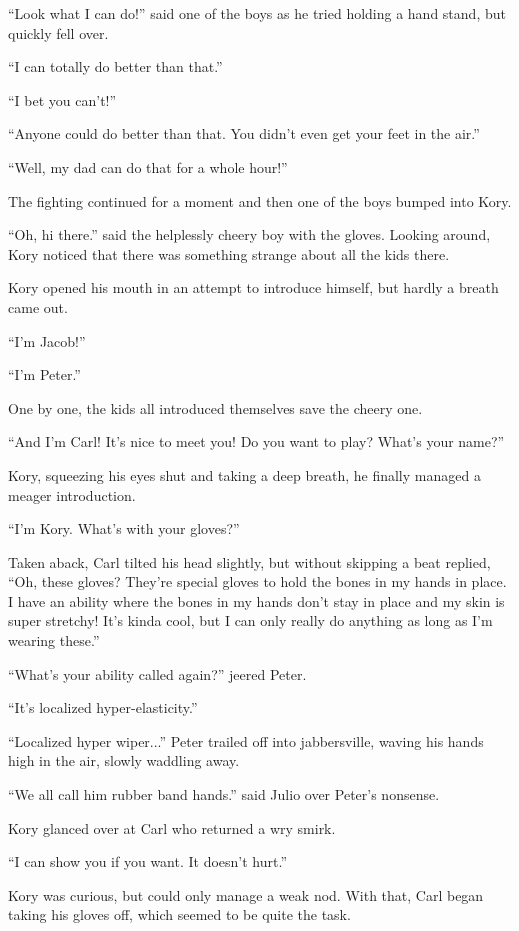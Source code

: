 ``Look what I can do!'' said one of the boys as he tried holding a hand stand, but quickly fell over.

``I can totally do better than that.''

``I bet you can't!''

``Anyone could do better than that. You didn't even get your feet in the air.''

``Well, my dad can do that for a whole hour!''

The fighting continued for a moment and then one of the boys bumped into Kory.

``Oh, hi there.'' said the helplessly cheery boy with the gloves. Looking around, Kory noticed that there was something strange about all the kids there.

Kory opened his mouth in an attempt to introduce himself, but hardly a breath came out.

``I'm Jacob!''

``I'm Peter.''

One by one, the kids all introduced themselves save the cheery one.

``And I'm Carl! It's nice to meet you! Do you want to play? What's your name?''

Kory, squeezing his eyes shut and taking a deep breath, he finally managed a meager introduction.

``I'm Kory. What's with your gloves?''

Taken aback, Carl tilted his head slightly, but without skipping a beat replied, ``Oh, these gloves? They're special gloves to hold the bones in my hands in place. I have an ability where the bones in my hands don't stay in place and my skin is super stretchy! It's kinda cool, but I can only really do anything as long as I'm wearing these.''

``What's your ability called again?'' jeered Peter.

``It's localized hyper-elasticity.''

``Localized hyper wiper...'' Peter trailed off into jabbersville, waving his hands high in the air, slowly waddling away.

``We all call him rubber band hands.'' said Julio over Peter's nonsense.

Kory glanced over at Carl who returned a wry smirk.

``I can show you if you want. It doesn't hurt.''

Kory was curious, but could only manage a weak nod. With that, Carl began taking his gloves off, which seemed to be quite the task.

